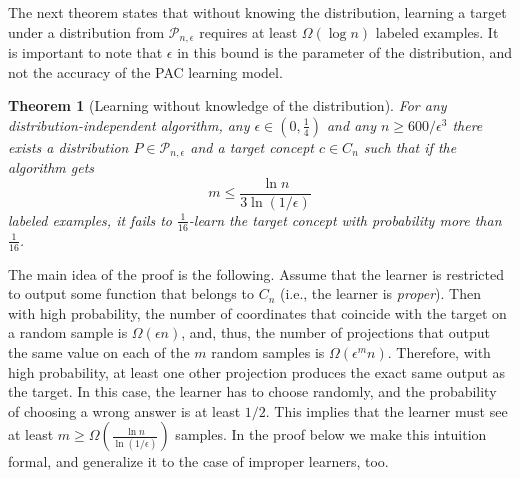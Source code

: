 \documentclass[11pt]{article}
\newtheorem{theorem}[proposition]{Theorem}
\renewcommand{\P}{\mathcal{P}}
\begin{document}
The next theorem states that without knowing the distribution,
learning a target under a distribution from $\P_{n,\epsilon}$
requires at least $\Omega(\log n)$ labeled examples. It is important to note that $\epsilon$ in this bound is the parameter of the distribution, and not the accuracy of the PAC learning model.

\begin{theorem}[Learning without knowledge of the distribution]
\label{thm: distribution independent bound}
For any distribution-independent algorithm, any $\epsilon \in (0,\frac{1}{4})$ and any
$n \ge 600/\epsilon^3$ there exists a distribution $P \in \P_{n,\epsilon}$ and a target
concept $c \in C_n$ such that if the algorithm gets
$$
m \le \frac{\ln n}{3 \ln (1/\epsilon)}
$$
labeled examples, it fails to $\frac{1}{16}$-learn the target concept with probability
more than $\frac{1}{16}$.
\end{theorem}

The main idea of the proof is the following. Assume that the learner is restricted to output some function that belongs to $C_n$ (i.e., the learner is \emph{proper}). Then with high probability, the number of coordinates that coincide with the target on a random sample is $\Omega(\epsilon n)$, and, thus, the number of projections that output the same value on each of the $m$ random samples is $\Omega(\epsilon^m n)$. Therefore, with high probability, at least one other projection produces the exact same output as the target. In this case, the learner has to choose randomly, and the probability of choosing a wrong answer is at least $1/2$. This implies that the learner must see at least $m \ge \Omega(\frac{\ln n}{\ln (1/\epsilon)})$ samples. In the proof below we make this intuition formal, and generalize it to the case of improper learners, too.
\end{document}

